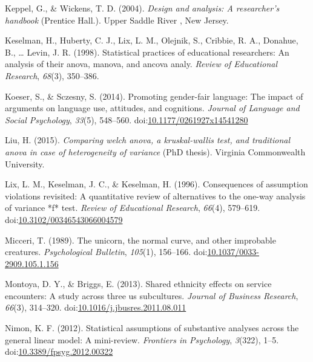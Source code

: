 \documentclass[man,floatsintext]{apa6}
\begin{document}
\leavevmode\hypertarget{ref-Keppel_and_Wickens_2004}{}%
Keppel, G., \& Wickens, T. D. (2004). \emph{Design and analysis: A researcher's handbook} (Prentice Hall.). Upper Saddle River , New Jersey.

\leavevmode\hypertarget{ref-Keselman_et_al_1998}{}%
Keselman, H., Huberty, C. J., Lix, L. M., Olejnik, S., Cribbie, R. A., Donahue, B., \ldots{} Levin, J. R. (1998). Statistical practices of educational researchers: An analysis of their anova, manova, and ancova analy. \emph{Review of Educational Research}, \emph{68}(3), 350--386.

\leavevmode\hypertarget{ref-Koeser_and_Sczesny_2014}{}%
Koeser, S., \& Sczesny, S. (2014). Promoting gender-fair language: The impact of arguments on language use, attitudes, and cognitions. \emph{Journal of Language and Social Psychology}, \emph{33}(5), 548--560. doi:\href{https://doi.org/10.1177/0261927x14541280}{10.1177/0261927x14541280}

\leavevmode\hypertarget{ref-Liu_2015}{}%
Liu, H. (2015). \emph{Comparing welch anova, a kruskal-wallis test, and traditional anova in case of heterogeneity of variance} (PhD thesis). Virginia Commonwealth University.

\leavevmode\hypertarget{ref-Lix_Keselman_Keselman_1996}{}%
Lix, L. M., Keselman, J. C., \& Keselman, H. (1996). Consequences of assumption violations revisited: A quantitative review of alternatives to the one-way analysis of variance *f* test. \emph{Review of Educational Research}, \emph{66}(4), 579--619. doi:\href{https://doi.org/10.3102/00346543066004579}{10.3102/00346543066004579}

\leavevmode\hypertarget{ref-Micceri_1989}{}%
Micceri, T. (1989). The unicorn, the normal curve, and other improbable creatures. \emph{Psychological Bulletin}, \emph{105}(1), 156--166. doi:\href{https://doi.org/10.1037/0033-2909.105.1.156}{10.1037/0033-2909.105.1.156}

\leavevmode\hypertarget{ref-Montoya_Briggs_2013}{}%
Montoya, D. Y., \& Briggs, E. (2013). Shared ethnicity effects on service encounters: A study across three us subcultures. \emph{Journal of Business Research}, \emph{66}(3), 314--320. doi:\href{https://doi.org/10.1016/j.jbusres.2011.08.011}{10.1016/j.jbusres.2011.08.011}

\leavevmode\hypertarget{ref-Nimon_2012}{}%
Nimon, K. F. (2012). Statistical assumptions of substantive analyses across the general linear model: A mini-review. \emph{Frontiers in Psychology}, \emph{3}(322), 1--5. doi:\href{https://doi.org/10.3389/fpsyg.2012.00322}{10.3389/fpsyg.2012.00322}
\end{document}
